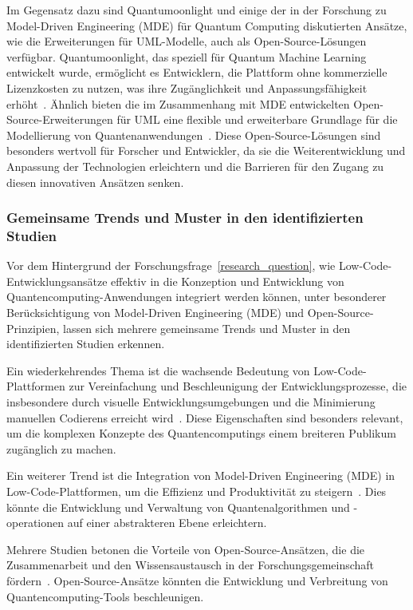 Im Gegensatz dazu sind Quantumoonlight und einige der in der Forschung zu Model-Driven Engineering (MDE) für Quantum Computing 
diskutierten Ansätze, wie die Erweiterungen für UML-Modelle, auch als Open-Source-Lösungen verfügbar. Quantumoonlight, das speziell 
für Quantum Machine Learning entwickelt wurde, ermöglicht es Entwicklern, die Plattform ohne kommerzielle Lizenzkosten zu nutzen, 
was ihre Zugänglichkeit und Anpassungsfähigkeit erhöht~\cite{Amato_2023}. Ähnlich bieten die im Zusammenhang mit MDE entwickelten 
Open-Source-Erweiterungen für UML eine flexible und erweiterbare Grundlage für die Modellierung von Quantenanwendungen~\cite{gemeinhardt2021towards}. 
Diese Open-Source-Lösungen sind besonders wertvoll für Forscher und Entwickler, da sie die Weiterentwicklung und Anpassung der 
Technologien erleichtern und die Barrieren für den Zugang zu diesen innovativen Ansätzen senken.

% 

\subsubsection{Gemeinsame Trends und Muster in den identifizierten Studien}

Vor dem Hintergrund der Forschungsfrage~\ref{research_question}, wie Low-Code-Entwicklungsansätze effektiv in die Konzeption 
und Entwicklung von Quantencomputing-Anwendungen integriert werden können, unter besonderer Berücksichtigung 
von Model-Driven Engineering (MDE) und Open-Source-Prinzipien, lassen sich mehrere gemeinsame Trends und 
Muster in den identifizierten Studien erkennen.

Ein wiederkehrendes Thema ist die wachsende Bedeutung von Low-Code-Plattformen zur Vereinfachung und 
Beschleunigung der Entwicklungsprozesse, die insbesondere durch visuelle Entwicklungsumgebungen und 
die Minimierung manuellen Codierens erreicht wird~\cite{Khorram_2020, Sahay_2020, Bock_2021}. Diese 
Eigenschaften sind besonders relevant, um die komplexen Konzepte des Quantencomputings einem breiteren Publikum zugänglich zu machen.

Ein weiterer Trend ist die Integration von Model-Driven Engineering (MDE) in Low-Code-Plattformen, 
um die Effizienz und Produktivität zu steigern~\cite{Gemeinhardt_2021, Moin_2021, Perez-Castillo_2022}. 
Dies könnte die Entwicklung und Verwaltung von Quantenalgorithmen und -operationen auf einer abstrakteren Ebene erleichtern.

Mehrere Studien betonen die Vorteile von Open-Source-Ansätzen, die die Zusammenarbeit und den Wissensaustausch 
in der Forschungsgemeinschaft fördern~\cite{Amato_2023, Gemeinhardt_2023}. Open-Source-Ansätze könnten die 
Entwicklung und Verbreitung von Quantencomputing-Tools beschleunigen.

